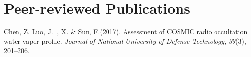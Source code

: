 \newcommand{\Revision}{\textit{under revision}}
\newcommand{\CS}{*} %
\newcommand{\CF}{\textsuperscript{\#}} %

\section*{Peer-reviewed Publications}

\begin{etaremune}
\item
    Chen, Z. Luo, J.,  \Xiao, X. \& Sun, F.(2017).
    Assessment of COSMIC radio occultation water vapor profile.
    \textit{Journal of National University of Defense Technology}, \textit{39}(3), 201--206.
\end{etaremune}

